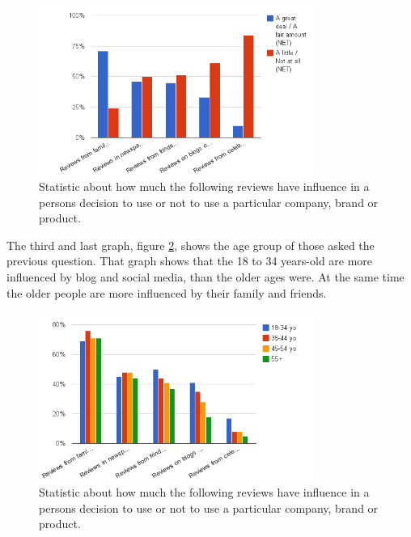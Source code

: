 \begin{figure}[H]
\centering
\includegraphics[width=0.8\textwidth]{Images/teori2.png}
\caption{Statistic about how much the following reviews have influence in a persons decision to use or not to use a particular company, brand or product.}
\label{Teori2}
\end{figure}

The third and last graph, figure \ref{Teori3}, shows the age group of those asked the previous question. That graph shows that the 18 to 34 years-old are more influenced by blog and social media, than the older ages were. At the same time the older people are more influenced by their family and friends.

\begin{figure}[H]
\centering
\includegraphics[width=0.8\textwidth]{Images/teori3.png}
\caption{Statistic about how much the following reviews have influence in a persons decision to use or not to use a particular company, brand or product.}
\label{Teori3}
\end{figure}